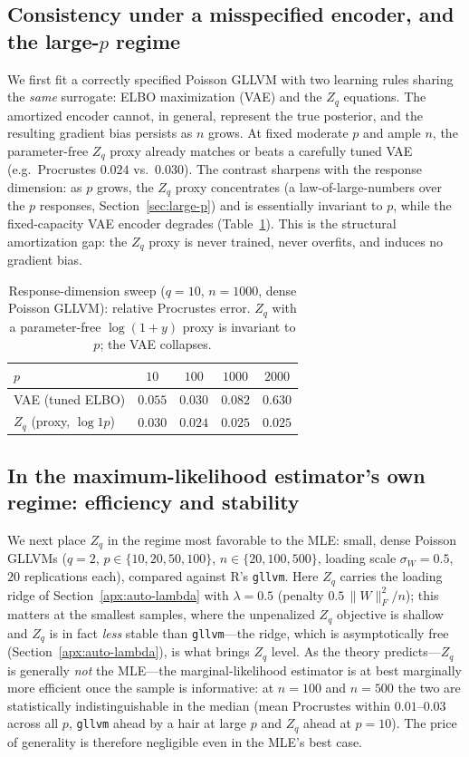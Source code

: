 \documentclass[twoside,11pt]{article}
\begin{document}
\subsection{Consistency under a misspecified encoder, and the large-$p$ regime}
\label{sec:exp-misspec}
We first fit a correctly specified Poisson GLLVM with two learning rules sharing the \emph{same} surrogate: ELBO maximization (VAE) and the $Z_q$ equations. The amortized encoder cannot, in general, represent the true posterior, and the resulting gradient bias persists as $n$ grows. At fixed moderate $p$ and ample $n$, the parameter-free $Z_q$ proxy already matches or beats a carefully tuned VAE (e.g.\ Procrustes $0.024$ vs.\ $0.030$). The contrast sharpens with the response dimension: as $p$ grows, the $Z_q$ proxy concentrates (a law-of-large-numbers over the $p$ responses, Section~\ref{sec:large-p}) and is essentially invariant to $p$, while the fixed-capacity VAE encoder degrades (Table~\ref{tab:psweep}). This is the structural amortization gap: the $Z_q$ proxy is never trained, never overfits, and induces no gradient bias.

\begin{table}[t]
\centering
\caption{Response-dimension sweep ($q{=}10$, $n{=}1000$, dense Poisson GLLVM): relative Procrustes error. $Z_q$ with a parameter-free $\log(1{+}y)$ proxy is invariant to $p$; the VAE collapses.}
\label{tab:psweep}
\begin{tabular}{lcccc}
\toprule
$p$ & $10$ & $100$ & $1000$ & $2000$\\
\midrule
VAE (tuned ELBO)        & $0.055$ & $0.030$ & $0.082$ & $0.630$\\
$Z_q$ (proxy, $\log1p$) & $0.030$ & $0.024$ & $0.025$ & $0.025$\\
\bottomrule
\end{tabular}
\end{table}

\subsection{In the maximum-likelihood estimator's own regime: efficiency and stability}
\label{sec:exp-turf}
We next place $Z_q$ in the regime most favorable to the MLE: small, dense Poisson GLLVMs ($q{=}2$, $p\in\{10,20,50,100\}$, $n\in\{20,100,500\}$, loading scale $\sigma_W{=}0.5$, $20$ replications each), compared against R's \texttt{gllvm}. Here $Z_q$ carries the loading ridge of Section~\ref{apx:auto-lambda} with $\lambda{=}0.5$ (penalty $0.5\,\|W\|_F^2/n$); this matters at the smallest samples, where the unpenalized $Z_q$ objective is shallow and $Z_q$ is in fact \emph{less} stable than \texttt{gllvm}---the ridge, which is asymptotically free (Section~\ref{apx:auto-lambda}), is what brings $Z_q$ level. As the theory predicts---$Z_q$ is generally \emph{not} the MLE---the marginal-likelihood estimator is at best marginally more efficient once the sample is informative: at $n{=}100$ and $n{=}500$ the two are statistically indistinguishable in the median (mean Procrustes within $0.01$--$0.03$ across all $p$, \texttt{gllvm} ahead by a hair at large $p$ and $Z_q$ ahead at $p{=}10$). The price of generality is therefore negligible even in the MLE's best case.
\end{document}
